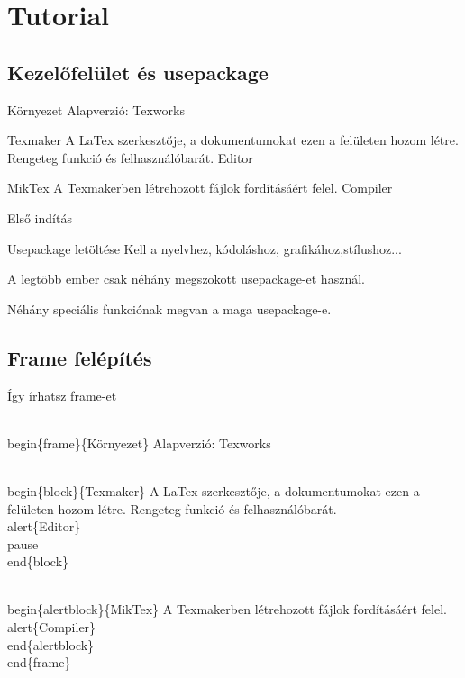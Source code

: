 \documentclass[11pt]{beamer}
\begin{document}
\section{Tutorial}

\subsection{Kezelőfelület és usepackage}

\begin{frame}{Környezet}
Alapverzió: Texworks

\begin{block}{Texmaker}
A LaTex szerkesztője, a dokumentumokat ezen a felületen hozom létre. Rengeteg funkció és felhasználóbarát. \alert{Editor} \pause
\end{block}

\begin{alertblock}{MikTex}
A Texmakerben létrehozott fájlok fordításáért felel. \alert{Compiler}
\end{alertblock}
\end{frame}

\begin{frame}{Első indítás}
\begin{block}{Usepackage letöltése}
Kell a nyelvhez, kódoláshoz, grafikához,stílushoz...
\end{block}

A legtöbb ember csak néhány megszokott usepackage-et használ.

Néhány speciális funkciónak megvan a maga usepackage-e.
\end{frame}

\subsection{Frame felépítés}

\begin{frame}[fragile]{Így írhatsz frame-et}
\begin{semiverbatim}
\\begin\{frame\}\{Környezet\}
Alapverzió: Texworks

\\begin\{block\}\{Texmaker\}
A LaTex szerkesztője, a dokumentumokat ezen a felületen 
hozom létre. Rengeteg funkció és felhasználóbarát.
 \\alert\{Editor\} \\pause
\\end\{block\}

\\begin\{alertblock\}\{MikTex\}
A Texmakerben létrehozott fájlok fordításáért felel.
 \\alert\{Compiler\}
\\end\{alertblock\}
\\end\{frame\}
\end{semiverbatim}
\end{frame}
\end{document}
